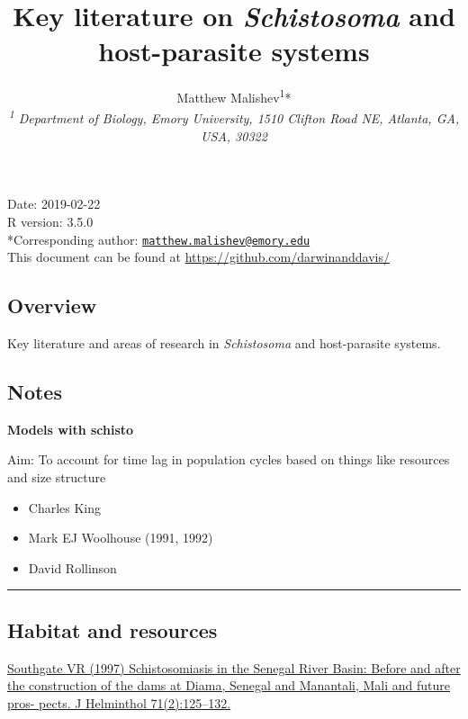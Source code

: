 \documentclass[10,portrait]{article}
\title{Key literature on \emph{Schistosoma} and host-parasite systems}
\author{Matthew
Malishev\textsuperscript{1}*\\[2\baselineskip]\emph{\textsuperscript{1}
Department of Biology, Emory University, 1510 Clifton Road NE, Atlanta,
GA, USA, 30322}}
\date{}
\providecommand{\tightlist}{%
  \setlength{\itemsep}{0pt}\setlength{\parskip}{0pt}}
\begin{document}
\maketitle

{
\hypersetup{linkcolor=black}
\setcounter{tocdepth}{3}
\tableofcontents
}
\newpage   

Date: 2019-02-22\\
R version: 3.5.0\\
*Corresponding author:
\href{mailto:matthew.malishev@emory.edu}{\nolinkurl{matthew.malishev@emory.edu}}\\
This document can be found at \url{https://github.com/darwinanddavis/}

\newpage  

\subsection{Overview}\label{overview}

Key literature and areas of research in \emph{Schistosoma} and
host-parasite systems.

\subsection{Notes}\label{notes}

\textbf{Models with schisto}

Aim: To account for time lag in population cycles based on things like
resources and size structure

\begin{itemize}
\tightlist
\item
  Charles King\\
\item
  Mark EJ Woolhouse (1991, 1992)\\
\item
  David Rollinson
\end{itemize}

\newpage  

\begin{center}\rule{0.5\linewidth}{\linethickness}\end{center}

\subsection{Habitat and resources}\label{habitat-and-resources}

\href{Southgate\%20VR\%20(1997)\%20Schistosomiasis\%20in\%20the\%20Senegal\%20River\%20Basin:\%20Before\%20and\%20after\%20the\%20construction\%20of\%20the\%20dams\%20at\%20Diama,\%20Senegal\%20and\%20Manantali,\%20Mali\%20and\%20future\%20pros-\%20pects.\%20J\%20Helminthol\%2071(2):125–132}{Southgate
VR (1997) Schistosomiasis in the Senegal River Basin: Before and after
the construction of the dams at Diama, Senegal and Manantali, Mali and
future pros- pects. J Helminthol 71(2):125--132.}
\end{document}
